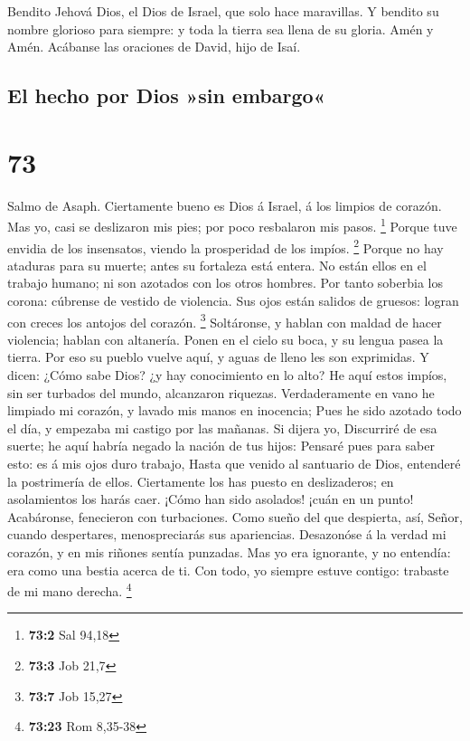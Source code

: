  Bendito Jehová Dios, el Dios de Israel, que solo hace
maravillas.  Y bendito su nombre glorioso para siempre: y
toda la tierra sea llena de su gloria. Amén y Amén. 
Acábanse las oraciones de David, hijo de Isaí.

\hypertarget{el-hecho-por-dios-sin-embargo}{%
\subsection{El hecho por Dios »sin
embargo«}\label{el-hecho-por-dios-sin-embargo}}

\hypertarget{section-72}{%
\section{73}\label{section-72}}

 Salmo de Asaph. Ciertamente bueno es Dios á Israel, á los
limpios de corazón.  Mas yo, casi se deslizaron mis pies;
por poco resbalaron mis pasos. \footnote{\textbf{73:2} Sal 94,18}
 Porque tuve envidia de los insensatos, viendo la
prosperidad de los impíos. \footnote{\textbf{73:3} Job 21,7}
 Porque no hay ataduras para su muerte; antes su fortaleza
está entera.  No están ellos en el trabajo humano; ni son
azotados con los otros hombres.  Por tanto soberbia los
corona: cúbrense de vestido de violencia.  Sus ojos están
salidos de gruesos: logran con creces los antojos del corazón.
\footnote{\textbf{73:7} Job 15,27}  Soltáronse, y hablan con
maldad de hacer violencia; hablan con altanería.  Ponen en
el cielo su boca, y su lengua pasea la tierra.  Por eso su
pueblo vuelve aquí, y aguas de lleno les son exprimidas.  Y
dicen: ¿Cómo sabe Dios? ¿y hay conocimiento en lo alto?  He
aquí estos impíos, sin ser turbados del mundo, alcanzaron riquezas.
 Verdaderamente en vano he limpiado mi corazón, y lavado
mis manos en inocencia;  Pues he sido azotado todo el día,
y empezaba mi castigo por las mañanas.  Si dijera yo,
Discurriré de esa suerte; he aquí habría negado la nación de tus hijos:
 Pensaré pues para saber esto: es á mis ojos duro trabajo,
 Hasta que venido al santuario de Dios, entenderé la
postrimería de ellos.  Ciertamente los has puesto en
deslizaderos; en asolamientos los harás caer.  ¡Cómo han
sido asolados! ¡cuán en un punto! Acabáronse, fenecieron con
turbaciones.  Como sueño del que despierta, así, Señor,
cuando despertares, menospreciarás sus apariencias. 
Desazonóse á la verdad mi corazón, y en mis riñones sentía punzadas.
 Mas yo era ignorante, y no entendía: era como una bestia
acerca de ti.  Con todo, yo siempre estuve contigo:
trabaste de mi mano derecha. \footnote{\textbf{73:23} Rom 8,35-38}

